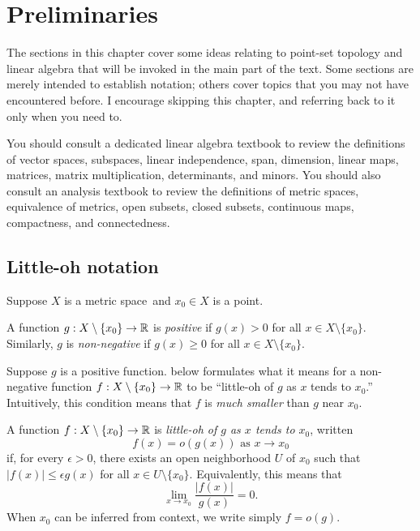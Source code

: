 \chapter{Preliminaries} \label{prelims}

The sections in this chapter cover some ideas relating to point-set topology and linear algebra that will be invoked in the main part of the text. Some sections are merely intended to establish notation; others cover topics that you may not have encountered before. I encourage skipping this chapter, and referring back to it only when you need to. 

You should consult a dedicated linear algebra textbook to review the definitions of vector spaces, subspaces, linear independence, span, dimension, linear maps, matrices, matrix multiplication, determinants, and minors. You should also consult an analysis textbook to review the definitions of metric spaces, equivalence of metrics, open subsets, closed subsets, continuous maps, compactness, and connectedness.

\section{Little-oh notation} \label{little-oh}

Suppose $X$ is a metric space\footnotemark\ and $x_0 \in X$ is a point. 


\begin{definition}
	A function $g : X \setminus \{x_0\} \to \mathbb{R}$ is \emph{positive} if $g(x) > 0$ for all $x \in X \setminus \{x_0\}$. Similarly, $g$ is \emph{non-negative} if $g(x) \geq 0$ for all $x \in X \setminus \{x_0\}$.
\end{definition}

Suppose $g$ is a positive function.  below formulates what it means for a non-negative function $f : X \setminus \{x_0\} \to \mathbb{R}$ to be ``little-oh of $g$ as $x$ tends to $x_0$.'' Intuitively, this condition means that $f$ is \emph{much smaller} than $g$ near $x_0$. 

\begin{definition} \label{little-o-definition}
	A function $f : X \setminus \{x_0\} \to \mathbb{R}$ is \emph{little-oh of $g$ as $x$ tends to $x_0$}, written \[ f(x) = o(g(x)) \text{ as } x \to x_0 \] 
	if, for every $\epsilon > 0$, there exists an open neighborhood $U$ of $x_0$ such that $|f(x)| \leq \epsilon g(x)$ for all $x \in U \setminus \{x_0\}$. Equivalently, this means that 
	\[ \lim_{x \to x_0} \frac{|f(x)|}{g(x)} = 0. \]
	When $x_0$ can be inferred from context, we write simply $f = o(g)$. 
\end{definition} 

